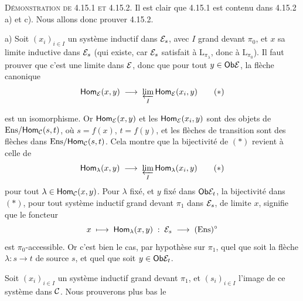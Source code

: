 \textsc{Démonstration de 4.15.1 et 4.15.2.} Il est clair que 4.15.1 est contenu dans 4.15.2 a) et c). Nous allons donc prouver 4.15.2.

a) Soit $(x_i)_{i\in I}$ un système inductif dans $\mathcal{E}_s$, avec $I$ grand devant $\pi_0$, et $x$ sa limite inductive dans $\mathcal{E}_s$ (qui existe, car $\mathcal{E}_s$ satisfait à $\mathrm{L}_{\pi_\lambda}$, donc à $\mathrm{L}_{\pi_0}$). Il faut prouver que c'est une limite dans $\mathcal{E}$, donc que pour tout $y \in \mathsf{Ob}\mathcal{E}$, la flèche canonique
\[
\Hom_{\cE}(x,y) \;\longrightarrow\; \varprojlim_{I} \Hom_{\cE}(x_i,y) \tag*{$(*)$}
\]

est un isomorphisme. Or $\mathsf{Hom}_{\mathcal{E}}(x,y)$ et les $\mathsf{Hom}_{\mathcal{E}}(x_i,y)$ sont des objets de $\mathrm{Ens}/\mathsf{Hom}_{\mathcal{C}}(s,t)$, où $s = f(x)$, $t = f(y)$, et les flèches de transition sont des flèches dans $\mathrm{Ens}/\mathsf{Hom}_{\mathcal{C}}(s,t)$. Cela montre que la bijectivité de $(*)$ revient à celle de
\[
\Hom_\lambda(x,y) \;\longrightarrow\; \varprojlim_{I} \Hom_\lambda(x_i,y) \tag*{$(*)$}
\]
pour tout $\lambda \in \mathsf{Hom}_{\mathcal{C}}(x,y)$. Pour $\lambda$ fixé, et $y$ fixé dans $\mathsf{Ob}\mathcal{E}_t$, la bijectivité dans $(*)$, pour tout système inductif grand devant $\pi_1$ dans $\mathcal{E}_s$, de limite $x$, signifie que le foncteur
\[
x \;\longmapsto\; \mathsf{Hom}_\lambda(x,y) \;:\; \mathcal{E}_s \;\longrightarrow\; (\mathrm{Ens})^\circ
\]
est $\pi_0$-accessible. Or c'est bien le cas, par hypothèse sur $\pi_1$, quel que soit la flèche $\lambda : s \longrightarrow t$ de source $s$, et quel que soit $y \in \mathsf{Ob}\mathcal{E}_t$.

Soit $(x_i)_{i\in I}$ un système inductif grand devant $\pi_1$, et $(s_i)_{i\in I}$ l'image de ce système dans $\mathcal{C}$. Nous prouverons plus bas le

